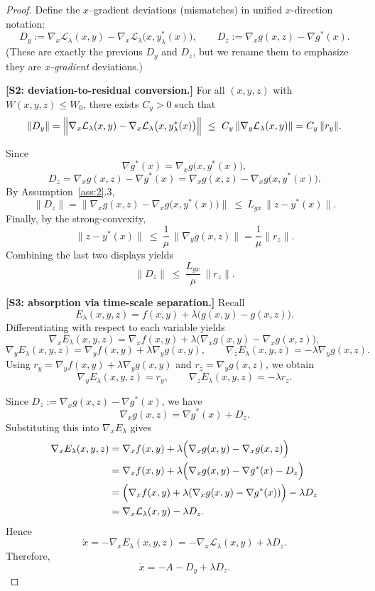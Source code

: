 \documentclass{article}
\newcommand{\1}{\mathbf{1}}
\begin{document}
\begin{proof}
Define the $x$--gradient deviations (mismatches) in unified $x$-direction notation:
\[
D_y:=\nabla_x \mathcal L_\lambda(x,y)-\nabla_x \mathcal L_\lambda\bigl(x,y_\lambda^{*}(x)\bigr),
\qquad
D_z:=\nabla_x g(x,z)-\nabla g^{*}(x).
\]
(These are exactly the previous $D_y$ and $D_z$, but we rename them to emphasize they are \emph{$x$-gradient} deviations.)

\textbf{[S2: deviation-to-residual conversion.]}
\smallskip
\noindent For all $(x,y,z)$ with $W(x,y,z)\le W_0$, there exists $C_y>0$ such that 
\begin{equation}\label{eq:Dy-bound}
\|D_y\|
=\Bigl\|\nabla_x \mathcal L_\lambda(x,y)-\nabla_x \mathcal L_\lambda\bigl(x,y_\lambda^{*}(x)\bigr)\Bigr\|
\ \le\ C_y\,\|\nabla_y \mathcal L_\lambda(x,y)\|
= C_y\,\|r_y\|.
\end{equation}

\smallskip
\noindent Since 
\[
\nabla g^{*}(x)=\nabla_x g\bigl(x,y^{*}(x)\bigr),
\]
\[
D_z
=\nabla_x g(x,z)-\nabla g^{*}(x)
=\nabla_x g(x,z)-\nabla_x g\bigl(x,y^{*}(x)\bigr).
\]
By Assumption~\ref{ass:2}.3,
\[
\|D_z\|
=\bigl\|\nabla_x g(x,z)-\nabla_x g\bigl(x,y^{*}(x)\bigr)\bigr\|
\ \le\ L_{gx}\,\|z-y^{*}(x)\|.
\]
Finally, by the strong-convexity,
\[
\|z-y^{*}(x)\|\ \le\ \frac{1}{\mu}\,\|\nabla_y g(x,z)\|
=\frac{1}{\mu}\|r_z\|.
\]
Combining the last two displays yields
\begin{equation}\label{eq:Dz-bound}
\|D_z\|\ \le\ \frac{L_{gx}}{\mu}\,\|r_z\|.
\end{equation}

\textbf{[S3: absorption via time-scale separation.]}
\noindent Recall
\[
E_{\lambda}(x,y,z)=f(x,y)+\lambda\bigl(g(x,y)-g(x,z)\bigr).
\]
Differentiating with respect to each variable yields
\[
\nabla_x E_\lambda(x,y,z)=\nabla_x f(x,y)+\lambda\bigl(\nabla_x g(x,y)-\nabla_x g(x,z)\bigr),
\]
\[
\nabla_y E_\lambda(x,y,z)=\nabla_y f(x,y)+\lambda\nabla_y g(x,y),
\qquad
\nabla_z E_\lambda(x,y,z)=-\lambda\nabla_y g(x,z).
\]
Using $r_y=\nabla_y f(x,y)+\lambda\nabla_y g(x,y)$ and $r_z=\nabla_y g(x,z)$, we obtain
\[
\nabla_y E_\lambda(x,y,z)=r_y,
\qquad
\nabla_z E_\lambda(x,y,z)=-\lambda r_z.
\]

\medskip
\noindent Since $D_z:=\nabla_x g(x,z)-\nabla g^{*}(x)$, we have
\[
\nabla_x g(x,z)=\nabla g^{*}(x)+D_z.
\]
Substituting this into $\nabla_x E_\lambda$ gives
\begin{align*}
\nabla_x E_\lambda(x,y,z)
&=\nabla_x f(x,y)+\lambda\Bigl(\nabla_x g(x,y)-\nabla_x g(x,z)\Bigr)\\
&=\nabla_x f(x,y)+\lambda\Bigl(\nabla_x g(x,y)-\nabla g^{*}(x)-D_z\Bigr)\\
&=\Bigl(\nabla_x f(x,y)+\lambda(\nabla_x g(x,y)-\nabla g^{*}(x))\Bigr)
-\lambda D_z\\
&=\nabla_x \mathcal L_\lambda(x,y)-\lambda D_z.
\end{align*}
Hence 
\[
\dot x=-\nabla_x E_\lambda(x,y,z)
=-\nabla_x \mathcal L_\lambda(x,y)+\lambda D_z.
\]
Therefore,
\begin{equation}\label{eq:xdot}
\dot x=-A-D_y+\lambda D_z.
\end{equation}


\end{proof}
\end{document}

